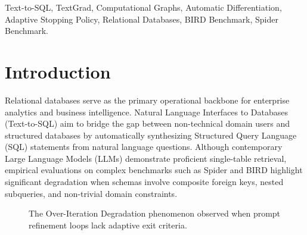 \documentclass[conference]{IEEEtran}
\begin{document}
\begin{IEEEkeywords}
Text-to-SQL, TextGrad, Computational Graphs, Automatic Differentiation, Adaptive Stopping Policy, Relational Databases, BIRD Benchmark, Spider Benchmark.
\end{IEEEkeywords}

\section{Introduction}

Relational databases serve as the primary operational backbone for enterprise analytics and business intelligence. Natural Language Interfaces to Databases (Text-to-SQL) aim to bridge the gap between non-technical domain users and structured databases by automatically synthesizing Structured Query Language (SQL) statements from natural language questions. Although contemporary Large Language Models (LLMs) demonstrate proficient single-table retrieval, empirical evaluations on complex benchmarks such as Spider \cite{yu2018spider} and BIRD \cite{li2024bird} highlight significant degradation when schemas involve composite foreign keys, nested subqueries, and non-trivial domain constraints.

\begin{figure}[t]
\centering
{}
\caption{The Over-Iteration Degradation phenomenon observed when prompt refinement loops lack adaptive exit criteria.}
\label{fig:paradox}
\end{figure}
\end{document}
